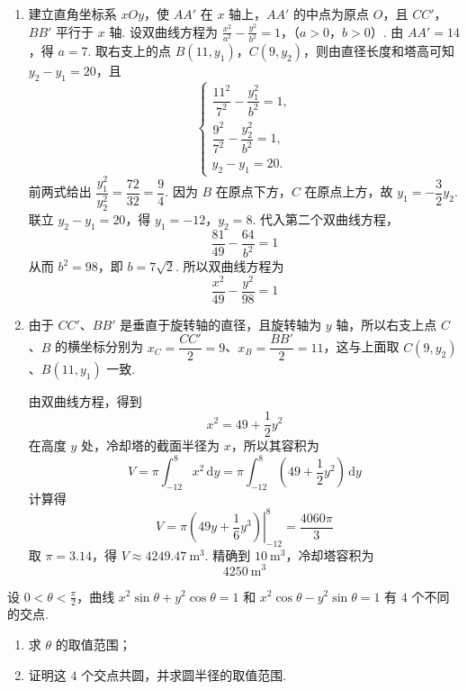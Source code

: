 \begin{solution}
\begin{enumerate}
\item 建立直角坐标系 \(xOy\)，使 \(AA'\) 在 \(x\) 轴上，\(AA'\) 的中点为原点 \(O\)，且 \(CC'\)，\(BB'\) 平行于 \(x\) 轴. 设双曲线方程为
\(\frac{x^2}{a^2}-\frac{y^2}{b^2}=1\)，（\(a>0\)，\(b>0\)）.
由 \(AA'=14\)，得 \(a=7\). 取右支上的点 \(B(11,y_1)\)，\(C(9,y_2)\)，则由直径长度和塔高可知 \(y_2-y_1=20\)，且
\[
\begin{cases}
\dfrac{11^2}{7^2}-\dfrac{y_1^2}{b^2}=1,\\
\dfrac{9^2}{7^2}-\dfrac{y_2^2}{b^2}=1,\\
y_2-y_1=20.
\end{cases}
\]
前两式给出 \(\dfrac{y_1^2}{y_2^2}=\dfrac{72}{32}=\dfrac94\). 因为 \(B\) 在原点下方，\(C\) 在原点上方，故 \(y_1=-\dfrac32y_2\). 联立 \(y_2-y_1=20\)，得
\(y_1=-12\)，\(y_2=8\).
代入第二个双曲线方程，
\[
\frac{81}{49}-\frac{64}{b^2}=1
\]
从而 \(b^2=98\)，即 \(b=7\sqrt2\). 所以双曲线方程为
\[
\frac{x^2}{49}-\frac{y^2}{98}=1
\]

\item 由于 \(CC'\)、\(BB'\) 是垂直于旋转轴的直径，且旋转轴为 \(y\) 轴，所以右支上点 \(C\)、\(B\) 的横坐标分别为 \(x_C=\dfrac{CC'}{2}=9\)、\(x_B=\dfrac{BB'}{2}=11\)，这与上面取 \(C(9,y_2)\)、\(B(11,y_1)\) 一致.

由双曲线方程，得到
\[
x^2=49+\frac12y^2
\]
在高度 \(y\) 处，冷却塔的截面半径为 \(x\)，所以其容积为
\[
V=\pi\int_{-12}^{8}x^2\,\mathrm dy
=\pi\int_{-12}^{8}\left(49+\frac12y^2\right)\,\mathrm dy
\]
计算得
\[
V=\pi\left.\left(49y+\frac16y^3\right)\right|_{-12}^{8}
=\frac{4060\pi}{3}
\]
    取 \(\pi=3.14\)，得 \(V\approx4249.47\mathrm{~m^3}\). 精确到 \(10\mathrm{~m^3}\)，冷却塔容积为
\[
4250\mathrm{~m^3}
\]
\end{enumerate}
\end{solution}

\begin{problem}
设 \(0<\theta<\frac{\pi}{2}\)，曲线 \(x^2\sin\theta+y^2\cos\theta=1\) 和 \(x^2\cos\theta-y^2\sin\theta=1\) 有 \(4\) 个不同的交点.

\begin{enumerate}
\item 求 \(\theta\) 的取值范围；
\item 证明这 \(4\) 个交点共圆，并求圆半径的取值范围.
\end{enumerate}
\end{problem}

